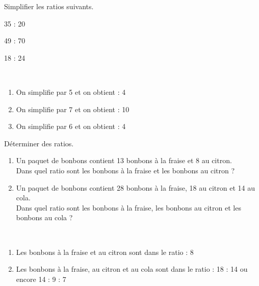 \begin{colonne*exercice}


\smallskip

\begin{exercice} %
   Simplifier les ratios suivants.
   \begin{colenumerate}{3}
      \item 35 : 20
      \item 49 : 70
      \item18 : 24
   \end{colenumerate}
\end{exercice}

\begin{corrige}
   \ \\ [-5mm]
   \begin{enumerate}
      \item On simplifie par 5 et on obtient { : 4}
      \item On simplifie par 7 et on obtient { : 10}
      \item On simplifie par 6 et on obtient { : 4}
   \end{enumerate}
\end{corrige}

\bigskip


\begin{exercice} %
   Déterminer des ratios.
   \begin{enumerate}
      \item Un paquet de bonbons contient 13 bonbons à la fraise et 8 au citron. \\
         Dans quel ratio sont les bonbons à la fraise et les bonbons au citron ?
      \item Un paquet de bonbons contient 28 bonbons à la fraise, 18 au citron et 14 au cola. \\
         Dans quel ratio sont les bonbons à la fraise, les bonbons au citron et les bonbons au cola ?
   \end{enumerate}
\end{exercice}

\begin{corrige}
   \ \\ [-5mm]
   \begin{enumerate}
      \item Les bonbons à la fraise et au citron sont dans le ratio { : 8}
      \item Les bonbons à la fraise, au citron et au cola sont dans le ratio { : 18 : 14} ou encore 14 : 9 : 7
   \end{enumerate}
\end{corrige}


\end{colonne*exercice}
